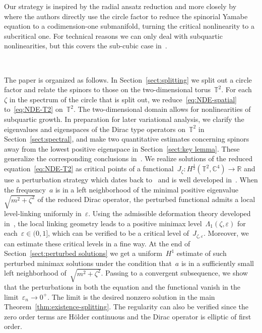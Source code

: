 \documentclass[11pt,final]{amsart}
\newcommand{\R}{\mathbb{R}}
\newcommand{\C}{\mathbb{C}}
\newcommand{\T}{\mathbb{T}}
\newcommand{\eps}{\varepsilon}
\begin{document}
Our strategy is inspired by the radial ansatz reduction and more closely by~\cite{SireXu2023variational} where the authors directly use the circle factor to reduce the spinorial Yamabe equation to a codimension-one submanifold, turning the critical nonlinearity to a subcritical one. 
For technical reasons we can only deal with subquartic nonlinearities, but this covers the sub-cubic case in~\cite{WZ2026Stationary}. 

\ 

The paper is organized as follows. 
In Section~\ref{sect:splitting} we split out a circle factor and relate the spinors to those on the two-dimensional torus~$\T^2$.
For each~$\zeta$ in the spectrum of the circle that is split out, we reduce~\eqref{eq:NDE-spatial} to~\eqref{eq:NDE-T2} on~$\T^2$. 
The two-dimensional domain allows for nonlinearities of subquartic growth. 
In preparation for later variational analysis, we clarify the eigenvalues and eigenspaces of the Dirac type operators on~$\T^2$ in Section~\ref{sect:spectral}, and make two quantitative estimates concerning spinors away from the lowest positive eigenspace in Section~\ref{sect:key lemma}. 
These generalize the corresponding conclusions in~\cite{WZ2026Stationary}. 
We realize solutions of the reduced equation~\eqref{eq:NDE-T2} as critical points of a functional~$J_\zeta\colon H^{\frac{1}{2}}(\T^2,\C^4)\to\R$ and use a perturbation strategy which dates back to~\cite{EstebanSere1995stationary} and is well developed in~\cite{WZ2026Stationary}.
When the frequency~$a$ is in a left neighborhood of the minimal positive eigenvalue~$\sqrt{m^2+\zeta^2}$ of the reduced Dirac operator, the perturbed functional admits a local level-linking uniformly in~$\eps$.
Using the admissible deformation theory developed in~\cite{WZ2026Stationary}, the local linking geometry leads to a positive minimax level~$\Lambda_1(\zeta,\eps)$ for each~$\eps\in (0,1]$, which can be verified to be a critical level of~$J_{\zeta,\eps}$.
Moreover, we can estimate these critical levels in a fine way. 
At the end of Section~\ref{sect:perturbed solutions} we get a uniform~$H^1$ estimate of such perturbed minimax solutions under the condition that~$a$ is in a sufficiently small left neighborhood of~$\sqrt{m^2+\zeta^2}$. 
Passing to a convergent subsequence, we show that the perturbations in both the equation and the functional vanish in the limit~$\eps_n\to 0^+$. 
The limit is the desired nonzero solution in the main Theorem~\ref{thm:existence-splitting}. 
The regularity can also be verified since the zero order terms are H\"older continuous and the Dirac operator is elliptic of first order. 
\end{document}
